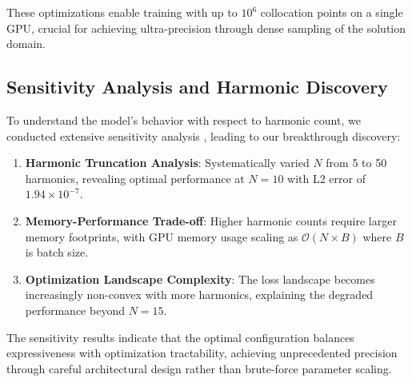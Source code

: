 These optimizations enable training with up to $10^6$ collocation points on a single GPU, crucial for achieving ultra-precision through dense sampling of the solution domain.

\subsection{Sensitivity Analysis and Harmonic Discovery}

To understand the model's behavior with respect to harmonic count, we conducted extensive sensitivity analysis \cite{psaros2023uncertainty}, leading to our breakthrough discovery:

\begin{enumerate}
    \item \textbf{Harmonic Truncation Analysis}: Systematically varied $N$ from 5 to 50 harmonics, revealing optimal performance at $N=10$ with L2 error of $1.94 \times 10^{-7}$.
    
    \item \textbf{Memory-Performance Trade-off}: Higher harmonic counts require larger memory footprints, with GPU memory usage scaling as $\mathcal{O}(N \times B)$ where $B$ is batch size.
    
    \item \textbf{Optimization Landscape Complexity}: The loss landscape becomes increasingly non-convex with more harmonics, explaining the degraded performance beyond $N=15$.
\end{enumerate}

The sensitivity results indicate that the optimal configuration balances expressiveness with optimization tractability, achieving unprecedented precision through careful architectural design rather than brute-force parameter scaling.



